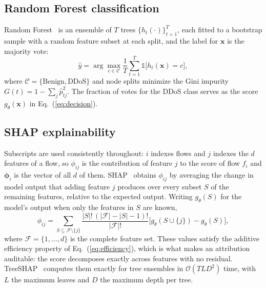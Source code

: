 \documentclass{ieeeaccess}
\begin{document}
\subsection{Random Forest classification}
Random Forest~\cite{breiman2001rf} is an ensemble of $T$ trees $\{h_t(\cdot)\}_{t=1}^{T}$, each fitted to a bootstrap sample with a random feature subset at each split, and the label for $\mathbf{x}$ is the majority vote:
\begin{equation}
\hat{y} = \arg\max_{c \in \mathcal{C}} \frac{1}{T} \sum_{t=1}^{T} \mathbb{1}\bigl[h_t(\mathbf{x}) = c\bigr],
\label{eq:rfpred}
\end{equation}
where $\mathcal{C} = \{\text{Benign}, \text{DDoS}\}$ and node splits minimize the Gini impurity $G(t) = 1 - \sum_{j} \hat{p}_{tj}^{2}$. The fraction of votes for the DDoS class serves as the score $g_{\theta}(\mathbf{x})$ in Eq.~(\ref{eq:decision}).

\subsection{SHAP explainability}
Subscripts are used consistently throughout: $i$ indexes flows and $j$ indexes the $d$ features of a flow, so $\phi_{ij}$ is the contribution of feature $j$ to the score of flow $f_i$ and $\boldsymbol{\phi}_i$ is the vector of all $d$ of them. SHAP~\cite{lundberg2017shap} obtains $\phi_{ij}$ by averaging the change in model output that adding feature $j$ produces over every subset $S$ of the remaining features, relative to the expected output. Writing $g_{\theta}(S)$ for the model's output when only the features in $S$ are known,
\begin{equation}
\phi_{ij} = \sum_{S \subseteq \mathcal{F} \setminus \{j\}} \frac{|S|!\,(|\mathcal{F}|-|S|-1)!}{|\mathcal{F}|!} \bigl[g_{\theta}(S \cup \{j\}) - g_{\theta}(S)\bigr],
\label{eq:shap}
\end{equation}
where $\mathcal{F} = \{1,\ldots,d\}$ is the complete feature set. These values satisfy the additive efficiency property of Eq.~(\ref{eq:efficiency}), which is what makes an attribution auditable: the score decomposes exactly across features with no residual. TreeSHAP~\cite{lundberg2020treeshap} computes them exactly for tree ensembles in $\mathcal{O}(TLD^2)$ time, with $L$ the maximum leaves and $D$ the maximum depth per tree.
\end{document}
